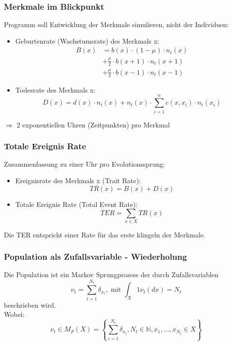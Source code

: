 \documentclass{beamer}
\begin{document}
	\begin{frame}
		\frametitle{Merkmale im Blickpunkt}
		Programm soll Entwicklung der Merkmale simulieren, nicht der Individuen:
		\pause
		\begin{itemize}
			\item Geburtenrate (Wachstumsrate) des Merkmals x: 
			\begin{align*}
				B(x) & = b(x) \cdot (1 - \mu) \cdot n_t(x) \\
				& + \frac{\mu}{2} \cdot b(x+1)\cdot n_t(x+1) \\ 
				& + \frac{\mu}{2} \cdot b(x-1)\cdot n_t(x-1)
			\end{align*}
			\pause
			\item Todesrate des Merkmals x: 
			\[ D(x) = d(x) \cdot n_t(x) + n_t(x) \cdot \sum_{i=1}^{n} c(x,x_i) \cdot n_t(x_i) \]
		\end{itemize}
		\pause
		$ \Rightarrow $ 2 exponentiellen Uhren (Zeitpunkten) pro Merkmal
	\end{frame}	
	\begin{frame}
		\frametitle{Totale Ereignis Rate}
		Zusammenfassung zu einer Uhr pro Evolutionssprung:
		\pause
		\begin{itemize}
			\item Ereignisrate des Merkmals x (Trait Rate):
			\[ TR(x) = B(x) + D(x) \]
			\pause
			\item Totale Ereignis Rate (Total Event Rate): 
			\[ TER = \sum_{x \in X} TR(x)\]
		\end{itemize}
		Die TER entspricht einer Rate für das erste klingeln der Merkmale.
	\end{frame}
	\begin{frame}
		\frametitle{Population als Zufallsvariable - Wiederholung}
		\pause
		Die Population ist ein Markov Sprungprozess der durch Zufallsvariablen
		\[ \nu_t = \sum_{i=1}^{N_t} \delta_{x_i}, \text{ mit } \int_X 1\nu_t(dx) = N_t \]
		beschrieben wird.\\
		Wobei:
		\[ \nu_t \in M_F(X) = \left\{ \sum_{i=1}^{N_t} \delta_{x_i}, N_t \in \mathbb{N}, x_1, \dots, x_{N_t} \in X \right\} \]
	\end{frame}
	
	
\end{document}
